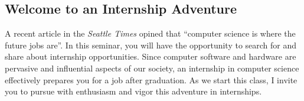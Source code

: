 \subsection*{Welcome to an Internship Adventure}

A recent article in the {\em Seattle Times} opined that ``computer science is where the future jobs are''.  In this
seminar, you will have the opportunity to search for and share about internship opportunities.  Since computer software
and hardware are pervasive and influential aspects of our society, an internship in computer science effectively
prepares you for a job after graduation.  As we start this class, I invite you to pursue with enthusiasm and
vigor this adventure in internships.


